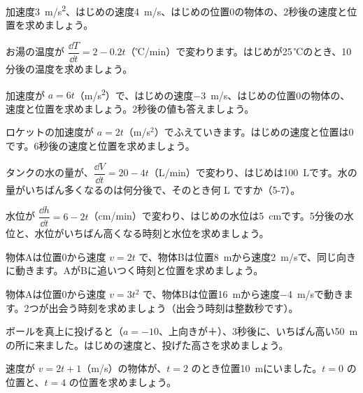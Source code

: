 \bkproblem 加速度\qty{3}{m/s^2}、はじめの速度\qty{4}{m/s}、はじめの位置0の物体の、2秒後の速度と位置を求めましょう。

\bkproblem お湯の温度が $\dfrac{\dd T}{\dd t}=2-0.2t$（℃/min）で変わります。はじめが25\,℃のとき、10分後の温度を求めましょう。


\bkproblem 加速度が $a=6t$（\unit{m/s^2}）で、はじめの速度\qty{-3}{m/s}、はじめの位置0の物体の、速度と位置を求めましょう。2秒後の値も答えましょう。

\bkproblem ロケットの加速度が $a=2t$（m/s$^2$）でふえていきます。はじめの速度と位置は0です。6秒後の速度と位置を求めましょう。

\bkproblem タンクの水の量が、$\dfrac{\dd V}{\dd t}=20-4t$（L/min）で変わり、はじめは\qty{100}{L}です。水の量がいちばん多くなるのは何分後で、そのとき何 L ですか（5-7）。

\bkproblem 水位が $\dfrac{\dd h}{\dd t}=6-2t$（cm/min）で変わり、はじめの水位は\qty{5}{cm}です。5分後の水位と、水位がいちばん高くなる時刻と水位を求めましょう。

\bkproblem 物体Aは位置0から速度 $v=2t$ で、物体Bは位置\qty{8}{m}から速度\qty{2}{m/s}で、同じ向きに動きます。AがBに追いつく時刻と位置を求めましょう。

\bkproblem 物体Aは位置0から速度 $v=3t^2$ で、物体Bは位置\qty{16}{m}から速度\qty{-4}{m/s}で動きます。2つが出会う時刻を求めましょう（出会う時刻は整数秒です）。

\bkproblem ボールを真上に投げると（$a=-10$、上向きが＋）、3秒後に、いちばん高い\qty{50}{m}の所に来ました。はじめの速度と、投げた高さを求めましょう。

\bkproblem 速度が $v=2t+1$（m/s）の物体が、$t=2$ のとき位置\qty{10}{m}にいました。$t=0$ の位置と、$t=4$ の位置を求めましょう。

